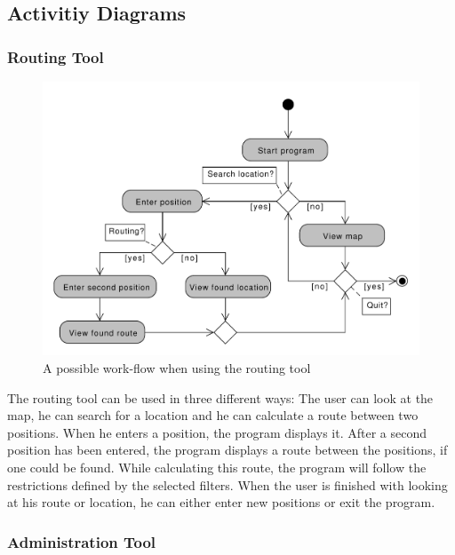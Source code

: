 \subsection{Activitiy Diagrams}

\subsubsection*{Routing Tool}

\begin{figure}[h]
	\centering
	\includegraphics[scale=0.5]{diagrams/activity_routing.pdf}
	\caption{A possible work-flow when using the routing tool}
\end{figure}

The routing tool can be used in three different ways: The user can look at the map, he can search for a location and he can calculate a route between two positions. When he enters a position, the program displays it. After a second position has been entered, the program displays a route between the positions, if one could be found. While calculating this route, the program will follow the restrictions defined by the selected filters. When the user is finished with looking at his route or location, he can either enter new positions or exit the program.

\subsubsection*{Administration Tool}

